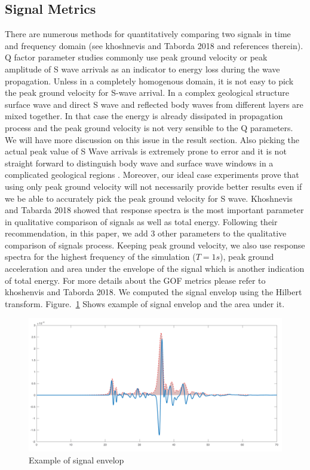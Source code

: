\subsection{Signal Metrics}

There are numerous methods for quantitatively comparing two signals in time and frequency domain (see khoshnevis and Taborda 2018 and references therein). Q factor parameter studies commonly use peak ground velocity or peak amplitude of S wave arrivals as an indicator to energy loss during the wave propagation. Unless in a completely homogenous domain, it is not easy to pick the peak ground velocity for S-wave arrival. In a complex geological structure surface wave and  direct S wave and reflected body waves from different layers are mixed together. In that case the energy is already dissipated in propagation process and the peak ground velocity is not very sensible to the Q parameters. We will have more discussion on this issue in the result section. Also picking the actual peak value of S Wave arrivals is extremely prone to error and it is not straight forward to distinguish body wave and surface wave windows in a complicated geological regions \citep[e.g., see][]{bowden2017earthquake}. Moreover, our ideal case experiments prove that using only peak ground velocity will not necessarily provide better results even if we be able to accurately pick the peak ground velocity for S wave. Khoshnevis and Tabarda 2018 showed that response spectra is the most important parameter in qualitative comparison of signals as well as total energy. Following their recommendation, in this paper, we add 3 other parameters to the qualitative comparison of signals process. Keeping peak ground velocity, we also use response spectra for the highest frequency of the simulation ($T= 1s$), peak ground acceleration and area under the envelope of the signal which is another indication of total energy. For more details about the GOF metrics please refer to  khoshenvis and Taborda 2018. We computed the signal envelop using the Hilbert transform. Figure.~\ref{fig:signal_envelop} Shows example of signal envelop and the area under it. 

  \begin{figure}[ht]
    \centering
    \includegraphics[width=\textwidth]{figures/pdf/signal_envelop.pdf}
    \caption{Example of signal envelop}
    \label{fig:signal_envelop}
\end{figure}


